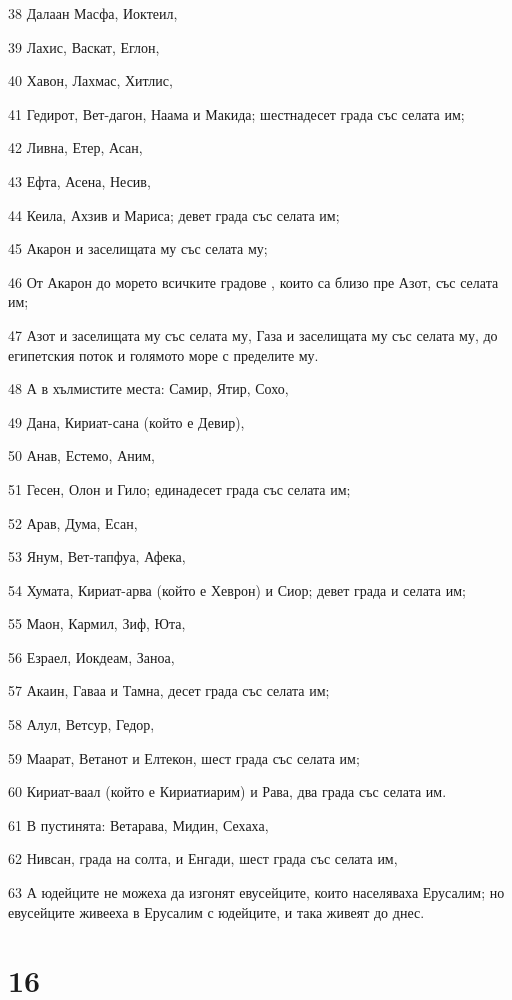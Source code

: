 \par 38 Далаан Масфа, Иоктеил,
\par 39 Лахис, Васкат, Еглон,
\par 40 Хавон, Лахмас, Хитлис,
\par 41 Гедирот, Вет-дагон, Наама и Макида; шестнадесет града със селата им;
\par 42 Ливна, Етер, Асан,
\par 43 Ефта, Асена, Несив,
\par 44 Кеила, Ахзив и Мариса; девет града със селата им;
\par 45 Акарон и заселищата му със селата му;
\par 46 От Акарон до морето всичките градове , които са близо пре Азот, със селата им;
\par 47 Азот и заселищата му със селата му, Газа и заселищата му със селата му, до египетския поток и голямото море с пределите му.
\par 48 А в хълмистите места: Самир, Ятир, Сохо,
\par 49 Дана, Кириат-сана (който е Девир),
\par 50 Анав, Естемо, Аним,
\par 51 Гесен, Олон и Гило; единадесет града със селата им;
\par 52 Арав, Дума, Есан,
\par 53 Янум, Вет-тапфуа, Афека,
\par 54 Хумата, Кириат-арва (който е Хеврон) и Сиор; девет града и селата им;
\par 55 Маон, Кармил, Зиф, Юта,
\par 56 Езраел, Иокдеам, Заноа,
\par 57 Акаин, Гаваа и Тамна, десет града със селата им;
\par 58 Алул, Ветсур, Гедор,
\par 59 Маарат, Ветанот и Елтекон, шест града със селата им;
\par 60 Кириат-ваал (който е Кириатиарим) и Рава, два града със селата им.
\par 61 В пустинята: Ветарава, Мидин, Сехаха,
\par 62 Нивсан, града на солта, и Енгади, шест града със селата им,
\par 63 А юдейците не можеха да изгонят евусейците, които населяваха Ерусалим; но евусейците живееха в Ерусалим с юдейците, и така живеят до днес.

\chapter{16}

